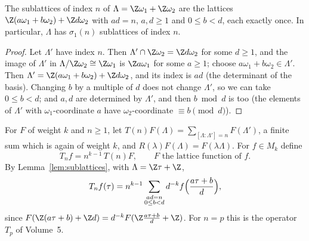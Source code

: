 \begin{lemma}\label{lem:sublattices}
The sublattices of index $n$ of $\Lambda=\Z\omega_1+\Z\omega_2$ are the lattices $\Z(a\omega_1+b\omega_2)+\Z d\omega_2$ with $ad=n$, $a,d\ge1$ and $0\le b<d$, each
exactly once. In particular, $\Lambda$ has $\sigma_1(n)$ sublattices of index $n$.
\end{lemma}
\begin{proof}
Let $\Lambda'$ have index $n$. Then $\Lambda'\cap\Z\omega_2=\Z d\omega_2$ for some $d\ge1$, and the image of $\Lambda'$ in $\Lambda/\Z\omega_2\cong\Z\omega_1$ is $\Z a\omega_1$ for some
$a\ge1$; choose $a\omega_1+b\omega_2\in\Lambda'$. Then $\Lambda'=\Z(a\omega_1+b\omega_2)+\Z d\omega_2$, and its index is $ad$ (the determinant of the basis). Changing $b$
by a multiple of $d$ does not change $\Lambda'$, so we can take $0\le b<d$; and $a,d$ are determined by $\Lambda'$, and then $b\bmod d$ is too (the elements of
$\Lambda'$ with $\omega_1$-coordinate $a$ have $\omega_2$-coordinate $\equiv b\pmod d$).
\end{proof}

For $F$ of weight $k$ and $n\ge1$, let $T(n)F(\Lambda)=\sum_{[\Lambda:\Lambda']=n}F(\Lambda')$, a finite sum which is again of weight $k$, and $R(\lambda)F(\Lambda)=F(\lambda\Lambda)$. For
$f\in M_k$ define
\[
T_nf=n^{k-1}\,T(n)F,\qquad F\text{ the lattice function of }f.
\]
By Lemma~\ref{lem:sublattices}, with $\Lambda=\Z\tau+\Z$,
\begin{equation}\label{eq:Tn}
T_nf(\tau)=n^{k-1}\sum_{\substack{ad=n\\0\le b<d}}d^{-k}f\Bigl(\frac{a\tau+b}d\Bigr),
\end{equation}
since $F(\Z(a\tau+b)+\Z d)=d^{-k}F(\Z\frac{a\tau+b}d+\Z)$. For $n=p$ this is the operator $T_p$ of Volume~5.

